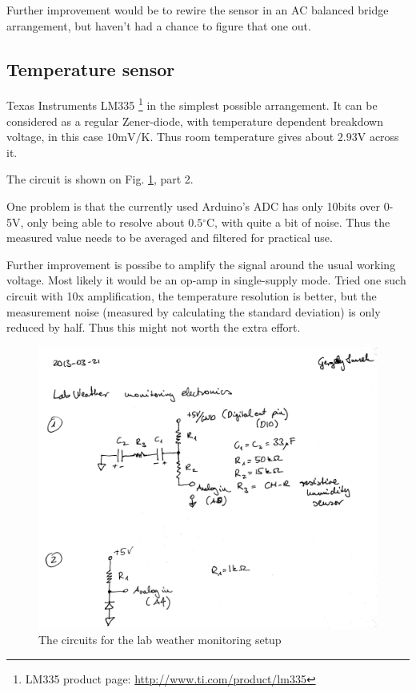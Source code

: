 \documentclass[12pt,a4paper]{article}
\begin{document}
Further improvement would be to rewire the sensor in an AC balanced bridge arrangement, but haven't had a chance to figure that one out.

\subsection{Temperature sensor}

Texas Instruments LM335 \footnote{LM335 product page: \url{http://www.ti.com/product/lm335}} in the simplest possible arrangement. It can be considered as a regular Zener-diode, with temperature dependent breakdown voltage, in this case $10\mathrm{mV}/\mathrm{K}$. Thus room temperature gives about $2.93\mathrm{V}$ across it.

The circuit is shown on Fig. \ref{fig:circuit}, part 2.

One problem is that the currently used Arduino's ADC has only 10bits over 0-5V, only being able to resolve about $0.5\mathrm{^\circ C}$, with quite a bit of noise. Thus the measured value needs to be averaged and filtered for practical use.

Further improvement is possibe to amplify the signal around the usual working voltage. Most likely it would be an op-amp in single-supply mode. Tried one such circuit with 10x amplification, the temperature resolution is better, but the measurement noise (measured by calculating the standard deviation) is only reduced by half. Thus this might not worth the extra effort.

\begin{figure}[ht!]
\centering
\includegraphics[width=140mm]{circuit.jpg}
\caption{The circuits for the lab weather monitoring setup}
\label{fig:circuit}
\end{figure}
\end{document}
